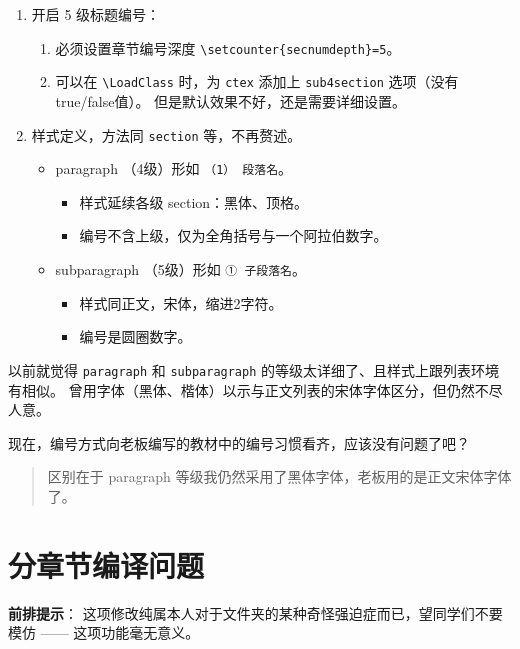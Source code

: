 \documentclass[../Main/thesis.tex]{subfiles}
\begin{document}
\begin{enumerate}
\item 开启 5 级标题编号：
\begin{enumerate}
  \def\labelenumii{\arabic{enumii}.}
  \item 必须设置章节编号深度
    \texttt{\textbackslash{}setcounter\{secnumdepth\}=5}。
  \item 可以在 \texttt{\textbackslash{}LoadClass} 时，为 \texttt{ctex} 添加上 \texttt{sub4section} 选项（没有true/false值）。
    但是默认效果不好，还是需要详细设置。
  \end{enumerate}
\item 样式定义，方法同 \texttt{section} 等，不再赘述。

  \begin{itemize}
  \item paragraph （4级）形如 \texttt{（1）\ 段落名}。
    \begin{itemize}
      \item 样式延续各级 section：黑体、顶格。
      \item 编号不含上级，仅为全角括号与一个阿拉伯数字。
    \end{itemize}
  \item subparagraph （5级）形如 \texttt{①\ 子段落名}。
    \begin{itemize}
    \item 样式同正文，宋体，缩进2字符。
    \item 编号是圆圈数字。
    \end{itemize}
  \end{itemize}
\end{enumerate}

以前就觉得 \texttt{paragraph} 和 \texttt{subparagraph} 的等级太详细了、且样式上跟列表环境有相似。
曾用字体（黑体、楷体）以示与正文列表的宋体字体区分，但仍然不尽人意。

现在，编号方式向老板编写的教材中的编号习惯看齐，应该没有问题了吧？

\begin{quote}
区别在于 paragraph 等级我仍然采用了黑体字体，老板用的是正文宋体字体了。
\end{quote}

\section{分章节编译问题}

\textbf{前排提示}：
这项修改纯属本人对于文件夹的某种奇怪强迫症而已，望同学们不要模仿 —— 这项功能毫无意义。
\end{document}
